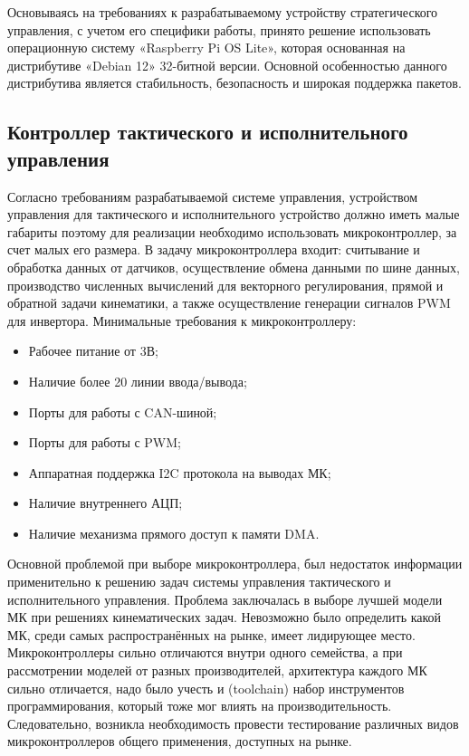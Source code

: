 Основываясь на требованиях к разрабатываемому устройству стратегического управления, с учетом его специфики работы, принято решение использовать операционную систему «Raspberry Pi OS Lite», которая основанная на дистрибутиве «Debian 12» 32-битной версии. Основной особенностью данного дистрибутива является стабильность, безопасность и широкая поддержка пакетов.

\subsection{Контроллер тактического и исполнительного управления}

Согласно требованиям разрабатываемой системе управления, устройством управления для тактического и исполнительного устройство должно иметь малые габариты поэтому для реализации необходимо использовать микроконтроллер, за счет малых его размера. В задачу микроконтроллера входит: считывание и обработка данных от датчиков, осуществление обмена данными по шине данных, производство численных вычислений для векторного регулирования, прямой и обратной задачи кинематики, а также осуществление генерации сигналов PWM для инвертора. Минимальные требования к микроконтроллеру:
\begin{itemize}
	\item Рабочее питание от 3В;
	\item Наличие более 20 линии ввода/вывода;
	\item Порты для работы с CAN-шиной;
	\item Порты для работы с PWM;
	\item Аппаратная поддержка I2C протокола на выводах МК;
	\item Наличие внутреннего АЦП;
	\item Наличие механизма прямого доступ к памяти DMA.
\end{itemize}

Основной проблемой при выборе микроконтроллера, был недостаток информации применительно к решению задач системы управления тактического и исполнительного управления. Проблема заключалась в выборе лучшей модели МК при решениях кинематических задач. Невозможно было определить какой МК, среди самых распространённых на рынке, имеет лидирующее место. Микроконтроллеры сильно отличаются внутри одного семейства, а при рассмотрении моделей от разных производителей, архитектура каждого МК сильно отличается, надо было учесть и (toolchain) набор инструментов программирования, который тоже мог влиять на производительность. Следовательно, возникла необходимость провести тестирование различных видов микроконтроллеров общего применения, доступных на рынке.

